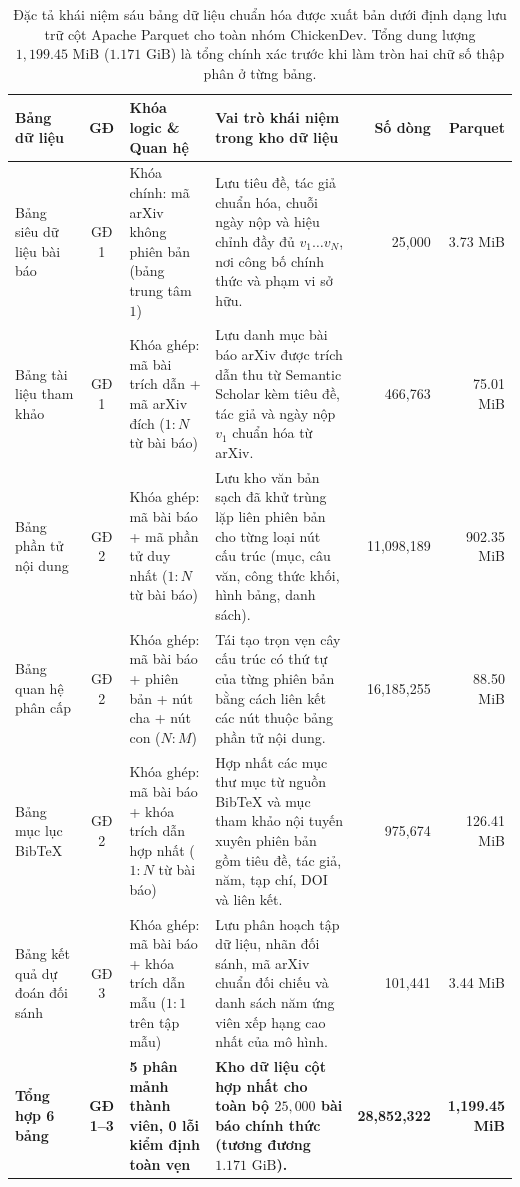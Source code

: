 \begin{table}[htbp]
    \centering
    \scriptsize
    \setlength{\tabcolsep}{4pt}
    \renewcommand{\arraystretch}{1.24}
    \begin{tabularx}{\textwidth}{p{} c p{} X r r}
        \toprule
        \textbf{Bảng dữ liệu} & \textbf{GĐ} & \textbf{Khóa logic \& Quan hệ} & \textbf{Vai trò khái niệm trong kho dữ liệu} & \textbf{Số dòng} & \textbf{Parquet} \\
        \midrule
        Bảng siêu dữ liệu bài báo & GĐ 1 & Khóa chính: mã arXiv không phiên bản (bảng trung tâm $1$) & Lưu tiêu đề, tác giả chuẩn hóa, chuỗi ngày nộp và hiệu chỉnh đầy đủ $v_1 \dots v_N$, nơi công bố chính thức và phạm vi sở hữu. & 25,000 & 3.73 MiB \\
        Bảng tài liệu tham khảo & GĐ 1 & Khóa ghép: mã bài trích dẫn + mã arXiv đích ($1:N$ từ bài báo) & Lưu danh mục bài báo arXiv được trích dẫn thu từ Semantic Scholar kèm tiêu đề, tác giả và ngày nộp $v_1$ chuẩn hóa từ arXiv. & 466,763 & 75.01 MiB \\
        Bảng phần tử nội dung & GĐ 2 & Khóa ghép: mã bài báo + mã phần tử duy nhất ($1:N$ từ bài báo) & Lưu kho văn bản sạch đã khử trùng lặp liên phiên bản cho từng loại nút cấu trúc (mục, câu văn, công thức khối, hình bảng, danh sách). & 11,098,189 & 902.35 MiB \\
        Bảng quan hệ phân cấp & GĐ 2 & Khóa ghép: mã bài báo + phiên bản + nút cha + nút con ($N:M$) & Tái tạo trọn vẹn cây cấu trúc có thứ tự của từng phiên bản bằng cách liên kết các nút thuộc bảng phần tử nội dung. & 16,185,255 & 88.50 MiB \\
        Bảng mục lục BibTeX & GĐ 2 & Khóa ghép: mã bài báo + khóa trích dẫn hợp nhất ($1:N$ từ bài báo) & Hợp nhất các mục thư mục từ nguồn BibTeX và mục tham khảo nội tuyến xuyên phiên bản gồm tiêu đề, tác giả, năm, tạp chí, DOI và liên kết. & 975,674 & 126.41 MiB \\
        Bảng kết quả dự đoán đối sánh & GĐ 3 & Khóa ghép: mã bài báo + khóa trích dẫn mẫu ($1:1$ trên tập mẫu) & Lưu phân hoạch tập dữ liệu, nhãn đối sánh, mã arXiv chuẩn đối chiếu và danh sách năm ứng viên xếp hạng cao nhất của mô hình. & 101,441 & 3.44 MiB \\
        \midrule
        \textbf{Tổng hợp 6 bảng} & \textbf{GĐ 1--3} & \textbf{5 phân mảnh thành viên, 0 lỗi kiểm định toàn vẹn} & \textbf{Kho dữ liệu cột hợp nhất cho toàn bộ $25{,}000$ bài báo chính thức (tương đương $1.171\text{ GiB}$).} & \textbf{28,852,322} & \textbf{1,199.45 MiB} \\
        \bottomrule
    \end{tabularx}
    \caption[Đặc tả khái niệm sáu bảng dữ liệu xuất bản Apache Parquet]{Đặc tả khái niệm sáu bảng dữ liệu chuẩn hóa được xuất bản dưới định dạng lưu trữ cột Apache Parquet cho toàn nhóm ChickenDev. Tổng dung lượng $1{,}199.45\text{ MiB}$ ($1.171\text{ GiB}$) là tổng chính xác trước khi làm tròn hai chữ số thập phân ở từng bảng.}
    \label{tab:six_tables}
\end{table}
